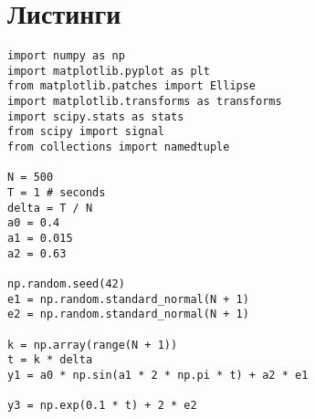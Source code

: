 \appendix
{}
\renewcommand{\thesection}{\Asbuk{section}}
\section{Листинги}

{
	\label{generation}
	\begin{verbatim}
import numpy as np
import matplotlib.pyplot as plt
from matplotlib.patches import Ellipse
import matplotlib.transforms as transforms
import scipy.stats as stats
from scipy import signal
from collections import namedtuple

N = 500
T = 1 # seconds
delta = T / N
a0 = 0.4
a1 = 0.015
a2 = 0.63

np.random.seed(42)
e1 = np.random.standard_normal(N + 1)
e2 = np.random.standard_normal(N + 1)

k = np.array(range(N + 1))
t = k * delta
y1 = a0 * np.sin(a1 * 2 * np.pi * t) + a2 * e1

y3 = np.exp(0.1 * t) + 2 * e2
	\end{verbatim}
}

